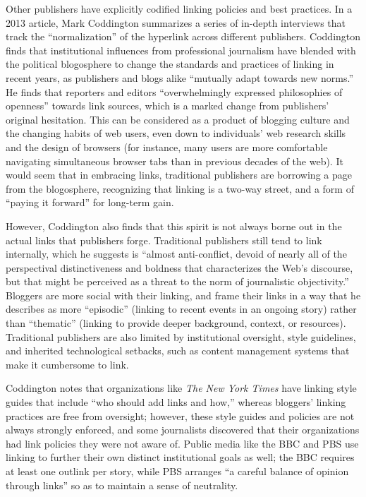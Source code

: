 Other publishers have explicitly codified linking policies and best practices. In a 2013 article, Mark Coddington summarizes a series of in-depth interviews that track the ``normalization'' of the hyperlink across different publishers. Coddington finds that institutional influences from professional journalism have blended with the political blogosphere to change the standards and practices of linking in recent years, as publishers and blogs alike ``mutually adapt towards new norms.''\autocite[140]{coddington_normalizing_2014} He finds that reporters and editors ``overwhelmingly expressed philosophies of openness'' towards link sources, which is a marked change from publishers' original hesitation.\autocite[2017]{coddington_building_2012} This can be considered as a product of blogging culture and the changing habits of web users, even down to individuals' web research skills and the design of browsers (for instance, many users are more comfortable navigating simultaneous browser tabs than in previous decades of the web). It would seem that in embracing links, traditional publishers are borrowing a page from the blogosphere, recognizing that linking is a two-way street, and a form of ``paying it forward'' for long-term gain.

However, Coddington also finds that this spirit is not always borne out in the actual links that publishers forge. Traditional publishers still tend to link internally, which he suggests is ``almost anti-conflict, devoid of nearly all of the perspectival distinctiveness and boldness that characterizes the Web's discourse, but that might be perceived as a threat to the norm of journalistic objectivity.''\autocite[2021]{coddington_building_2012} Bloggers are more social with their linking, and frame their links in a way that he describes as more ``episodic'' (linking to recent events in an ongoing story) rather than ``thematic'' (linking to provide deeper background, context, or resources). Traditional publishers are also limited by institutional oversight, style guidelines, and inherited technological setbacks, such as content management systems that make it cumbersome to link.\autocite[Deuze 148-149; Vobic 363]{coddington_normalizing_2014,vobic_practice_2013}

Coddington notes that organizations like \emph{The New York Times} have linking style guides that include ``who should add links and how,'' whereas bloggers' linking practices are free from oversight; however, these style guides and policies are not always strongly enforced, and some journalists discovered that their organizations had link policies they were not aware of.\autocite[149]{coddington_normalizing_2014} Public media like the BBC and PBS use linking to further their own distinct institutional goals as well; the BBC requires at least one outlink per story, while PBS arranges ``a careful balance of opinion through links'' so as to maintain a sense of neutrality.\autocite[151]{coddington_normalizing_2014,bbc_putting_2010}


